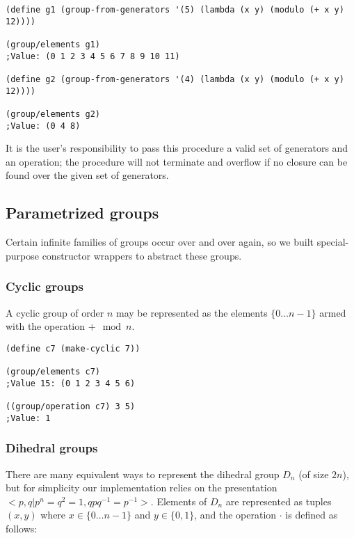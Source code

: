 \documentclass{article}
\begin{document}
\begin{verbatim}
(define g1 (group-from-generators '(5) (lambda (x y) (modulo (+ x y) 12))))

(group/elements g1)
;Value: (0 1 2 3 4 5 6 7 8 9 10 11)

(define g2 (group-from-generators '(4) (lambda (x y) (modulo (+ x y) 12))))

(group/elements g2)
;Value: (0 4 8)
\end{verbatim}
         
            It is the user's responsibility to pass this procedure a valid set of generators and an operation; the procedure will not terminate and overflow if no closure can be found over the given set of generators.
        
        \subsection{Parametrized groups}
        
            Certain infinite families of groups occur over and over again, so we built special-purpose constructor wrappers to abstract these groups.
            
            \subsubsection{Cyclic groups}
            
                A cyclic group of order $n$ may be represented as the elements $\{0 \ldots n-1\}$ armed with the operation $+ \mod n$.
        
\begin{verbatim}         
(define c7 (make-cyclic 7))

(group/elements c7)
;Value 15: (0 1 2 3 4 5 6)

((group/operation c7) 3 5)
;Value: 1
\end{verbatim}
        
            \subsubsection{Dihedral groups}
        
                There are many equivalent ways to represent the dihedral group $D_n$ (of size $2n$), but for simplicity our implementation relies on the presentation $<p,q|p^n = q^2 = 1, qpq^{-1} = p^{-1}>$. Elements of $D_n$ are represented as tuples $(x,y)$ where $x \in \{ 0 \ldots n-1\}$ and $y \in \{0, 1\}$, and the operation $\cdot$ is defined as follows:
        
\end{document}
